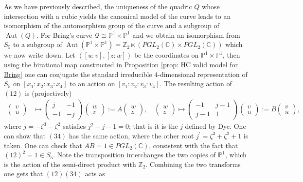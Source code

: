 \documentclass{amsart}
\DeclareMathOperator{\Aut}{Aut}
\begin{document}
As we have previously described, the uniqueness of the
quadric $Q$ whose intersection with a cubic yields the canonical model of the curve leads to an isomorphism of the automorphism group of the curve and a subgroup of $\Aut(Q)$. For Bring's curve $\mathcal{Q} \cong\mathbb{P}^1 \times \mathbb{P}^1$ and we obtain an  isomorphism from $S_5$ to a subgroup of $\Aut(\mathbb{P}^1 \times \mathbb{P}^1) = \mathbb{Z}_2 \ltimes (PGL_2(\mathbb{C}) \times PGL_2(\mathbb{C}))$ which we now write down. Let $([u:v], [z:w])$ be the coordinates on $\mathbb{P}^1 \times \mathbb{P}^1$, then using the birational map constructed in Proposition \ref{prop: HC valid model for Bring} one can conjugate the standard irreducible 4-dimensional representation of $S_5$ on $[x_1: x_2 : x_3 : x_4]$ to an action on $[v_1 : v_2 : v_3 : v_4]$. The resulting action of $(12)$ is (projectively)
\begin{align}\label{can12}
    \begin{pmatrix}
    v \\ u
    \end{pmatrix} &\mapsto \begin{pmatrix}
    j & -1 \\ -1 & -j
    \end{pmatrix} \begin{pmatrix}
    w \\ z
    \end{pmatrix}:=A \begin{pmatrix}
    w \\ z
    \end{pmatrix}, \quad
    \begin{pmatrix}
    w \\ z
    \end{pmatrix} \mapsto \begin{pmatrix}
    -1 & j-1 \\ j-1 & 1
    \end{pmatrix}\begin{pmatrix}
    v \\ u
    \end{pmatrix}:=B\begin{pmatrix}
    v \\ u
    \end{pmatrix}, 
\end{align}
where $j = - \zeta^3 - \zeta^2$ satisfies $j^2-j-1=0$; that is it is the $j$ defined by Dye. One can show that $(34)$ has the same action, where the other root $j^\prime = \zeta^3+\zeta^2+1$ is taken. One can check that $AB = 1 \in PGL_2(\mathbb{C})$, consistent with the fact that $(12)^2=1 \in S_5$. Note the transposition interchanges the two copies of $\mathbb{P}^1$, which is the action of the semi-direct product with $\mathbb{Z}_2$. Combining the two transforms one gets that $(12)(34)$ acts as 
\end{document}

